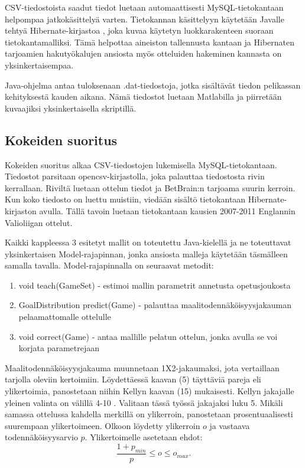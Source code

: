 \documentclass[a4paper,finnish,titlepage,12pt]{article}
\begin{document}
CSV-tiedostoista saadut tiedot luetaan automaattisesti MySQL-tietokantaan helpompaa jatkokäsittelyä varten. Tietokannan käsittelyyn käytetään Javalle tehtyä Hibernate-kirjastoa \cite{hibernate}, joka kuvaa käytetyn luokkarakenteen suoraan tietokantamalliksi. Tämä helpottaa aineiston tallennusta kantaan ja Hibernaten tarjoamien hakutyökalujen ansiosta myös otteluiden hakeminen kannasta on yksinkertaisempaa. 

Java-ohjelma antaa tuloksenaan .dat-tiedostoja, jotka sisältävät tiedon pelikassan kehityksestä kauden aikana.
Nämä tiedostot luetaan Matlabilla \cite{matlab} ja piirretään kuvaajiksi yksinkertaisella skriptillä.


\subsection{Kokeiden suoritus}
Kokeiden suoritus alkaa CSV-tiedostojen lukemisella MySQL-tietokantaan. Tiedostot parsitaan opencsv-kirjastolla, joka palauttaa tiedostosta rivin kerrallaan. Riviltä luetaan ottelun tiedot ja BetBrain:n tarjoama suurin kerroin. Kun koko tiedosto on luettu muistiin, viedään sisältö tietokantaan Hibernate-kirjaston avulla. Tällä tavoin luetaan tietokantaan kausien 2007-2011 Englannin Valioliigan ottelut.

Kaikki kappleessa 3 esitetyt mallit on toteutettu Java-kielellä ja ne toteuttavat yksinkertaisen Model-rajapinnan, jonka ansiosta malleja käytetään täsmälleen samalla tavalla. Model-rajapinnalla on seuraavat metodit:
\begin{enumerate}
	\item{void teach(GameSet) - estimoi mallin parametrit annetusta opetusjoukosta}
	\item{GoalDistribution predict(Game) - palauttaa maalitodennäköisyysjakauman pelaamattomalle ottelulle}
	\item{void correct(Game) - antaa mallille pelatun ottelun, jonka avulla se voi korjata parametrejaan}
\end{enumerate}

Maalitodennäköisyysjakauma muunnetaan 1X2-jakaumaksi, jota vertaillaan tarjolla oleviin kertoimiin. Löydettäessä kaavan (5) täyttäviä pareja eli ylikertoimia, panostetaan niihin Kellyn kaavan (15) mukaisesti. Kellyn jakajalle yleinen valinta on välillä 4-10 \cite{divider}. Valitaan tässä työssä jakajaksi luku 5. Mikäli samassa ottelussa kahdella merkillä on ylikerroin, panostetaan prosentuaalisesti suurempaan ylikertoimeen. Olkoon löydetty ylikerroin $o$ ja vastaava todennäköisyysarvio $p$. Ylikertoimelle asetetaan ehdot:
\begin{equation}
	\frac{1 + p_{min}}{p} \le o \le o_{max}.
\end{equation}
\end{document}
